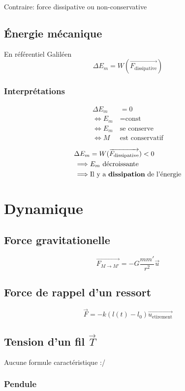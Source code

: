 \documentclass{article}
\renewcommand{\vec}{\overrightarrow}
\begin{document}
Contraire: force dissipative ou non-conservative



\subsection{Énergie mécanique}

En référentiel Galiléen
\[
	\Delta E_m = W(\vec{F_{\text{dissipative}}})
\] 
\subsubsection{Interprétations}

\begin{align*}
	\Delta E_m &= 0 \\
	\iff E_m &= \text{const} \\
	\iff E_m\ &\text{se conserve} \\
	\iff M\ &\text{est conservatif}
\end{align*}

\begin{align*}
	\Delta E_m &= W(\vec{F_{\text{dissipative}}}) < 0 \\
	\implies &E_m\ \text{décroissante} \\
	\implies &\text{Il y a {\bf dissipation} de l'énergie}
\end{align*}

\newpage
\section{Dynamique}
\subsection{Force gravitationelle}

\[
	\vec{F_{M\to M'}} = -G \frac{mm'}{r^2}\vec u
\] 

\subsection{Force de rappel d'un ressort}
\[
	\vec F = -k(l(t)-l_0)\vec{u_{\text{etirement}}}
\] 

\subsection{Tension d'un fil $\vec T$}

Aucune formule caractéristique :/

\subsubsection{Pendule}
\end{document}
